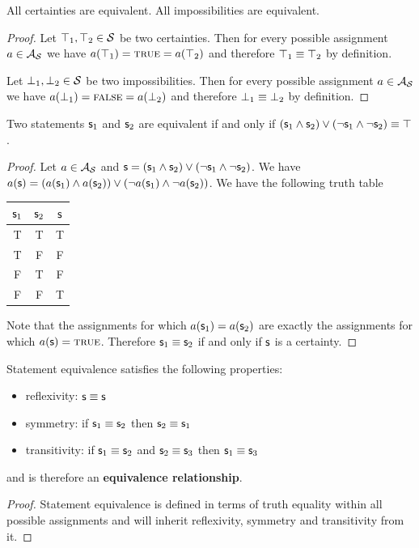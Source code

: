 	\begin{mathSection}
		
		\begin{coro}
			All certainties are equivalent. All impossibilities are equivalent.
		\end{coro}
		\begin{proof}
			Let $\top_1, \top_2 \in \mathcal{S}$ be two certainties. Then for every possible assignment $a \in \mathcal{A}_{\mathcal{S}}$ we have $a(\top_1) = \textup{\textsc{true}} = a(\top_2)$ and therefore $\top_1 \equiv \top_2$ by definition.
			
			Let $\bot_1, \bot_2 \in \mathcal{S}$ be two impossibilities. Then for every possible assignment $a \in \mathcal{A}_{\mathcal{S}}$ we have $a(\bot_1) = \textup{\textsc{false}} = a(\bot_2)$ and therefore $\bot_1 \equiv \bot_2$ by definition.
		\end{proof}
		
		\begin{coro}
			Two statements $\mathsf{s}_1$ and $\mathsf{s}_2$ are equivalent if and only if $(\mathsf{s}_1 \wedge \mathsf{s}_2) \vee (\neg\mathsf{s}_1 \wedge \neg\mathsf{s}_2) \equiv \top$.
		\end{coro}
		\begin{proof}
			Let $a \in \mathcal{A}_{\mathcal{S}}$ and $\mathsf{s} = ( \mathsf{s}_1 \wedge \mathsf{s}_2) \vee (\neg\mathsf{s}_1 \wedge \neg\mathsf{s}_2)$. We have $a(\mathsf{s}) = (a(\mathsf{s}_1) \wedge a(\mathsf{s}_2)) \vee (\neg a(\mathsf{s}_1) \wedge \neg a(\mathsf{s}_2))$. We have the following truth table
			\begin{center}
				\begin{tabular}{c|c|c}
					$\mathsf{s}_1$ & $\mathsf{s}_2$ & $\mathsf{s}$\\
					\hline
					T & T & T \\
					T & F & F \\
					F & T & F \\
					F & F & T\\
				\end{tabular}
			\end{center}
			Note that the assignments for which $a(\mathsf{s}_1) = a(\mathsf{s}_2)$ are exactly the assignments for which $a(\mathsf{s}) = \textup{\textsc{true}}$. Therefore $\mathsf{s}_1 \equiv \mathsf{s}_2$ if and only if $\mathsf{s}$ is a certainty.
		\end{proof}
		
		\begin{coro}
			Statement equivalence satisfies the following properties:
			\begin{itemize}
				\item reflexivity: $\mathsf{s} \equiv \mathsf{s}$
				\item symmetry: if $\mathsf{s}_1 \equiv \mathsf{s}_2$ then $\mathsf{s}_2 \equiv \mathsf{s}_1$
				\item transitivity: if $\mathsf{s}_1 \equiv \mathsf{s}_2$ and $\mathsf{s}_2 \equiv \mathsf{s}_3$ then $\mathsf{s}_1 \equiv \mathsf{s}_3$
			\end{itemize}
			and is therefore an \textbf{equivalence relationship}.
		\end{coro}
		\begin{proof}
			Statement equivalence is defined in terms of truth equality within all possible assignments and will inherit reflexivity, symmetry and transitivity from it.
		\end{proof}
		

\end{mathSection}
